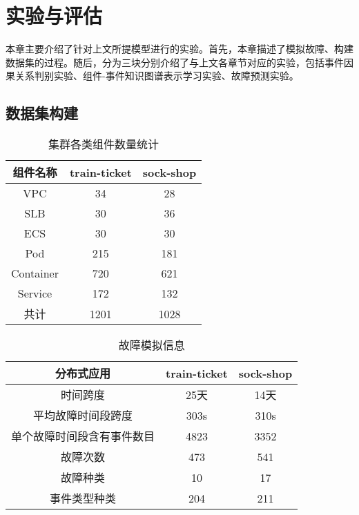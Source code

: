 \chapter{实验与评估}
本章主要介绍了针对上文所提模型进行的实验。首先，本章描述了模拟故障、构建数据集的过程。随后，分为三块分别介绍了与上文各章节对应的实验，包括事件因果关系判别实验、组件-事件知识图谱表示学习实验、故障预测实验。

\section{数据集构建}
\begin{table}[htbp]
    \caption{集群各类组件数量统计}
    \label{component-num}
    \centering
    \begin{tabular}{ccc}
    \toprule
    组件名称      & train-ticket & sock-shop        \\ \midrule
    VPC       & 34           & 28 \\
    SLB       & 30           & 36 \\
    ECS       & 30           & 30 \\
    Pod       & 215          & 181 \\
    Container & 720          & 621 \\
    Service   & 172          & 132 \\ \midrule
    共计   & 1201          & 1028 \\ \bottomrule
    \end{tabular}
\end{table}

\begin{table}[htbp]
    \caption{故障模拟信息}
    \centering
    \label{failure-simulation-info}
    \begin{tabular}{ccc}
    \toprule
    分布式应用       & train-ticket & \multicolumn{1}{c}{sock-shop} \\ \midrule
    时间跨度       & 25天          & 14天                           \\
    平均故障时间段跨度  & 303s         & 310s                          \\
    单个故障时间段含有事件数目 & 4823         & 3352                          \\
    故障次数       & 473          & 541                           \\
    故障种类       & 10           & 17                            \\
    事件类型种类     & 204          & 211                           \\ 
    \bottomrule
    \end{tabular}
\end{table}

